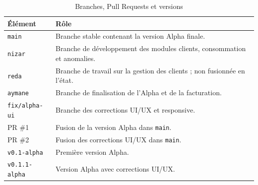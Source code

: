 \begin{table}[H]
\centering
\caption{Branches, Pull Requests et versions}
\label{tab:git}
\small
\begin{tabular}{p{}p{}}
\toprule
\textbf{Élément} & \textbf{Rôle} \\
\midrule
\texttt{main} & Branche stable contenant la version Alpha finale. \\
\texttt{nizar} & Branche de développement des modules clients, consommation et anomalies. \\
\texttt{reda} & Branche de travail sur la gestion des clients ; non fusionnée en l'état. \\
\texttt{aymane} & Branche de finalisation de l'Alpha et de la facturation. \\
\texttt{fix/alpha-ui} & Branche des corrections UI/UX et responsive. \\
PR \#1 & Fusion de la version Alpha dans \texttt{main}. \\
PR \#2 & Fusion des corrections UI/UX dans \texttt{main}. \\
\texttt{v0.1-alpha} & Première version Alpha. \\
\texttt{v0.1.1-alpha} & Version Alpha avec corrections UI/UX. \\
\bottomrule
\end{tabular}
\end{table}
